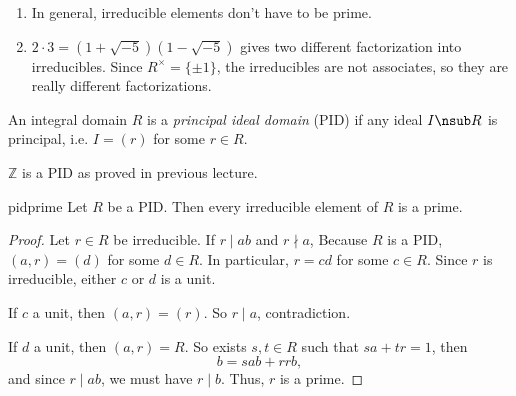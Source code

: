 \begin{remark}
    \leavevmode
    \begin{enumerate}
        \item In general, irreducible elements don't have to be prime.
        \item \(2\cdot 3 = (1 + \sqrt{-5})(1 - \sqrt{-5})\) gives two different factorization into irreducibles. Since \(R^\times = \{\pm 1\}\), the irreducibles are not associates, so they are really different factorizations.
    \end{enumerate}
\end{remark}
\begin{definition}{}{}
    An integral domain \(R\) is a \textit{principal ideal domain} (PID) if any ideal \(I \nsub R\) is principal, i.e. \(I = (r)\) for some \(r \in R\).
\end{definition}
\begin{example}
    \(\mathbb{Z}\) is a PID as proved in previous lecture.
\end{example}
\begin{proposition}{}{pidprime}
    Let \(R\) be a PID. Then every irreducible element of \(R\) is a prime.
\end{proposition}
\begin{proof}
    Let \(r \in R\) be irreducible. If \(r \mid ab\) and \(r \nmid a\), Because \(R\) is a PID, \((a,r) = (d)\) for some \(d \in R\). In particular, \(r = cd\) for some \(c \in R\). Since \(r\) is irreducible, either \(c\) or \(d\) is a unit.

    If \(c\) a unit, then \((a,r) = (r)\). So \(r \mid a\), contradiction.

    If \(d\) a unit, then \((a,r) = R\). So exists \(s,t \in R\) such that \(sa + t r= 1\), then
    \[
        b = sab + r rb,
    \]
    and since \(r \mid ab\), we must have \(r \mid b\). Thus, \(r\) is a prime.
\end{proof}
